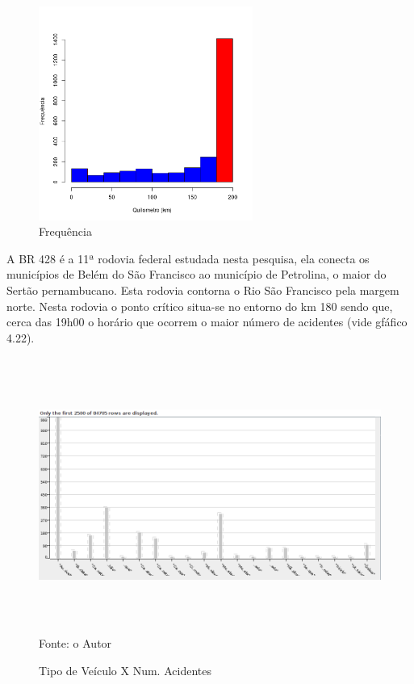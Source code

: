 \quad \quad
\begin{figure}[h]
	\centering
	\caption{ Frequência}
	\includegraphics[width=7cm,height=7cm]{Figuras/Preprocess/br428_3.png}
\end{figure}

A BR 428 é a 11ª rodovia federal estudada nesta pesquisa, ela conecta os municípios de Belém do São Francisco ao município de Petrolina, o maior do Sertão pernambucano. Esta rodovia contorna o Rio São Francisco pela margem norte. Nesta rodovia o ponto crítico situa-se no entorno do km 180 sendo que, cerca das 19h00 o horário que ocorrem o maior número de acidentes (vide gfáfico 4.22).  
\pagebreak

\begin{figure}[ht]
\begin{center}
\caption{Tipo de Veículo X Num. Acidentes}
\includegraphics[width=150mm, height=90mm]{Figuras/Preprocess/TipoVeiculoXNumAciden.png}\\
\tiny Fonte: o Autor
\end{center}
\end{figure}

